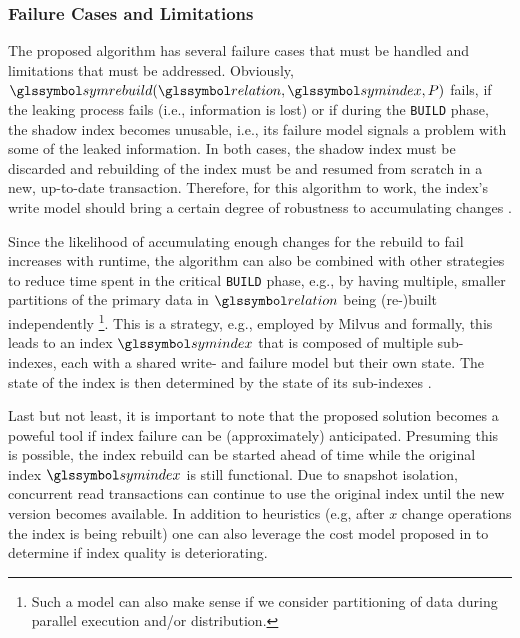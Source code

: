 \subsubsection{Failure Cases and Limitations}

The proposed algorithm has several failure cases that must be handled and limitations that must be addressed. Obviously, $\symrebuild(\relation,\symindex,P)$ fails, if the leaking process fails (i.e., information is lost) or if during the \texttt{BUILD} phase, the shadow index becomes unusable, i.e., its failure model signals a problem with some of the leaked information. In both cases, the shadow index must be discarded and rebuilding of the index must be and resumed from scratch in a new, up-to-date transaction. Therefore, for this algorithm to work, the index's write model should bring a certain degree of robustness to accumulating changes . 

Since the likelihood of accumulating enough changes for the rebuild to fail increases with runtime, the algorithm can also be combined with other strategies to reduce time spent in the critical \texttt{BUILD} phase, e.g., by having multiple, smaller partitions of the primary data in $\relation$ being (re-)built independently \footnote{Such a model can also make sense if we consider partitioning of data during parallel execution and/or distribution.}. This is a strategy, e.g., employed by Milvus \cite{Wang:2021Milvus} and formally, this leads to an index $\symindex$ that is composed of multiple sub-indexes, each with a shared write- and failure model but their own state. The state of the index is then determined by the state of its sub-indexes .

Last but not least, it is important to note that the proposed solution becomes a poweful tool if index failure can be (approximately) anticipated. Presuming this is possible, the index rebuild can be started ahead of time while the original index $\symindex$ is still functional. Due to snapshot isolation, concurrent read transactions can continue to use the original index until the new version becomes available. In addition to heuristics (e.g, after $x$ change operations the index is being rebuilt) one can also leverage the cost model proposed in  to determine if index quality is deteriorating.

